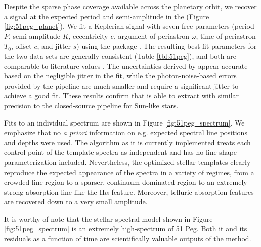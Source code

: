 \documentclass[twocolumn]{aastex62}
\begin{document}
Despite the sparse phase coverage available across the planetary orbit, we recover a signal at the expected period and semi-amplitude in the \RVs (Figure \ref{fig:51peg_planet}). 
We fit a Keplerian signal with seven free parameters (period $P$, \RV semi-amplitude $K$, eccentricity $e$, argument of periastron $\omega$, time of periastron $T_0$, \RV offset $c$, and \RV jitter $s$) using the  package \citep{exoplanet}. 
The resulting best-fit parameters for the two data sets are generally consistent (Table \ref{tbl:51peg}), and both are comparable to literature values \citep{Mayor1995, Naef2004, Butler2006}. 
The \RV uncertainties derived by \wobble appear accurate based on the negligible jitter in the fit, while the photon-noise-based \RV errors provided by the \HARPS pipeline are much smaller and require a significant jitter to achieve a good fit. 
These results confirm that \wobble is able to extract \RVs with similar precision to the closed-source \HARPS pipeline for Sun-like stars.


Fits to an individual spectrum are shown in Figure \ref{fig:51peg_spectrum}. 
We emphasize that no \textit{a priori} information on e.g. expected spectral line positions and depths were used. 
The \wobble algorithm as it is currently implemented treats each control point of the template spectra as independent and has no line shape parameterization included. 
Nevertheless, the optimized stellar templates clearly reproduce the expected appearance of the spectra in a variety of regimes, from a crowded-line region to a sparser, continuum-dominated region to an extremely strong absorption line like the H$\alpha$ feature. 
Moreover, telluric absorption features are recovered down to a very small amplitude.

It is worthy of note that the stellar spectral model shown in Figure \ref{fig:51peg_spectrum} is an extremely high-\SNR spectrum of 51 Peg. 
Both it and its residuals as a function of time are scientifically valuable outputs of the \wobble method. 
\end{document}
